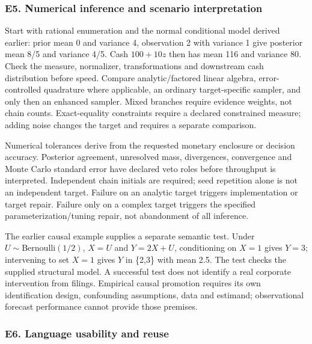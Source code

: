 \hypertarget{e5.-numerical-inference-and-scenario-interpretation}{%
\subsubsection{E5. Numerical inference and scenario interpretation}\label{e5.-numerical-inference-and-scenario-interpretation}}

Start with rational enumeration and the normal conditional model derived earlier: prior mean 0 and variance 4, observation 2 with variance 1 give posterior mean 8/5 and variance 4/5. Cash \(100+10z\) then has mean 116 and variance 80. Check the measure, normalizer, transformations and downstream cash distribution before speed. Compare analytic/factored linear algebra, error-controlled quadrature where applicable, an ordinary target-specific sampler, and only then an enhanced sampler. Mixed branches require evidence weights, not chain counts. Exact-equality constraints require a declared constrained measure; adding noise changes the target and requires a separate comparison.

Numerical tolerances derive from the requested monetary enclosure or decision accuracy. Posterior agreement, unresolved mass, divergences, convergence and Monte Carlo standard error have declared veto roles before throughput is interpreted. Independent chain initials are required; seed repetition alone is not an independent target. Failure on an analytic target triggers implementation or target repair. Failure only on a complex target triggers the specified parameterization/tuning repair, not abandonment of all inference.

The earlier causal example supplies a separate semantic test. Under \(U\sim\mathrm{Bernoulli}(1/2)\), \(X=U\) and \(Y=2X+U\), conditioning on \(X=1\) gives \(Y=3\); intervening to set \(X=1\) gives \(Y\) in \{2,3\} with mean 2.5. The test checks the supplied structural model. A successful test does not identify a real corporate intervention from filings. Empirical causal promotion requires its own identification design, confounding assumptions, data and estimand; observational forecast performance cannot provide those premises.

\hypertarget{e6.-language-usability-and-reuse}{%
\subsubsection{E6. Language usability and reuse}\label{e6.-language-usability-and-reuse}}

